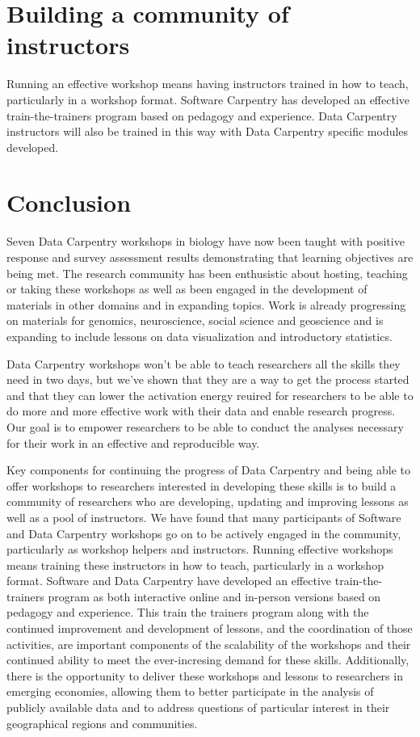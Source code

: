 \documentclass[15]{idcc}
\begin{document}
\begin{itemize}
\section{Building a community of instructors}

Running an effective workshop means having instructors trained in how to teach, particularly in a workshop format. Software Carpentry has developed an effective train-the-trainers program based on pedagogy and experience. Data Carpentry instructors will also be trained in this way with Data Carpentry specific modules developed.






\section{Conclusion}


Seven Data Carpentry workshops in biology have now been taught with positive response and survey
assessment results demonstrating that learning objectives are being met. The research community
has been enthusistic about hosting, teaching or taking these workshops as well as been engaged in
 the development of materials in other domains and in expanding topics. Work is already progressing on materials
for genomics, neuroscience, social science and geoscience and is expanding to include lessons on data visualization and introductory statistics.

Data Carpentry workshops won't be able to teach researchers all the skills they need in two days, but we've shown that
they are a way to get the process started and that they can lower the activation energy reuired for researchers to be
 able to do more and more effective work with their data and enable research progress. Our goal is to empower
researchers to be able to conduct the analyses necessary for their work in an effective
and reproducible way.

Key components for continuing the progress of Data Carpentry and being able to offer workshops to researchers interested in developing these
skills is to build a community of researchers who are developing, updating and improving lessons as well as a pool of instructors. We have
found that many participants of Software and Data Carpentry workshops go on to be actively engaged in the community, particularly as workshop
helpers and instructors. Running effective workshops means training these instructors in how to teach, particularly in a workshop format.
Software and Data Carpentry have developed an effective train-the-trainers program as both interactive online and in-person versions
based on pedagogy and experience. This train the trainers program along with the continued improvement and development of lessons, and the coordination
 of those activities, are important components of the scalability of the workshops and their continued ability to meet
 the ever-incresing demand for these skills. Additionally, there is the opportunity to deliver these workshops and lessons to researchers in emerging
 economies, allowing them to better participate in the analysis
of publicly available data and to address questions of particular interest in their geographical regions and communities.


\end{itemize}
\end{document}
